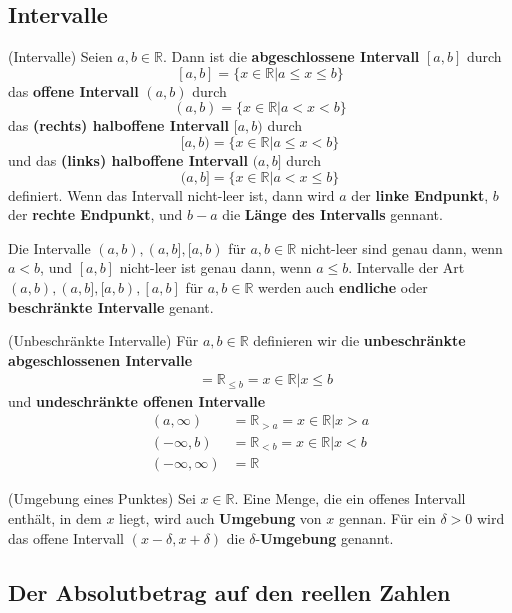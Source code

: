 \documentclass[../Analysis1_script.tex]{subfiles}
\begin{document}
\subsection{Intervalle}

\begin{definition}{(Intervalle)}
	Seien $a, b \in \mathbb{R}$. Dann ist die \textbf{abgeschlossene Intervall} $[a, b]$ durch
	\[ [a,b] = \{x \in \mathbb{R} | a \leq x \leq b\} \]
	das \textbf{offene Intervall} $(a, b)$ durch
	\[ (a,b) = \{x \in \mathbb{R} | a < x < b\} \]
	das \textbf{(rechts) halboffene Intervall} $[a, b)$ durch
	\[ [a,b) = \{x \in \mathbb{R} | a \leq x < b\} \]
	und das \textbf{(links) halboffene Intervall} $(a, b]$ durch
	\[ (a,b] = \{x \in \mathbb{R} | a < x \leq b\} \]
	definiert. Wenn das Intervall nicht-leer ist, dann wird $a$ der \textbf{linke Endpunkt}, $b$ der \textbf{rechte Endpunkt}, und $b - a$ die \textbf{Länge des Intervalls} gennant.
	
	Die Intervalle $(a, b), (a, b], [a, b)$ für $a, b \in \mathbb{R}$ nicht-leer sind genau dann, wenn $a < b$, und $[a, b]$ nicht-leer ist genau dann, wenn $a \leq b$. Intervalle der Art $(a, b), (a, b], [a, b), [a, b]$ für $a, b \in \mathbb{R}$ werden auch \textbf{endliche} oder \textbf{beschränkte Intervalle} genant.
\end{definition}

\begin{definition}{(Unbeschränkte Intervalle)}
	Für $a, b \in \mathbb{R}$ definieren wir die \textbf{unbeschränkte abgeschlossenen Intervalle}
	\begin{align*}
		[a, \infty) &= \mathbb{R}_{\geq a} = {x \in \mathbb{R} | x \geq a}\\
		(-\infty, b] &= \mathbb{R}_{\leq b} = {x \in \mathbb{R} | x \leq b}
	\end{align*}
	und \textbf{undeschränkte offenen Intervalle}
	\begin{align*}
		(a, \infty) &= \mathbb{R}_{> a} = {x \in \mathbb{R} | x > a}\\
		(-\infty, b) &= \mathbb{R}_{< b} = {x \in \mathbb{R} | x < b}\\
		(-\infty, \infty) &= \mathbb{R}
	\end{align*}
\end{definition}

\begin{definition}{(Umgebung eines Punktes)}
	Sei $x \in \mathbb{R}$. Eine Menge, die ein offenes Intervall enthält, in dem $x$ liegt, wird auch \textbf{Umgebung} von $x$ gennan. Für ein $\delta > 0$ wird das offene Intervall $(x - \delta, x + \delta)$ die $\delta$-\textbf{Umgebung} genannt.
\end{definition}

\subsection{Der Absolutbetrag auf den reellen Zahlen}


\end{document}
